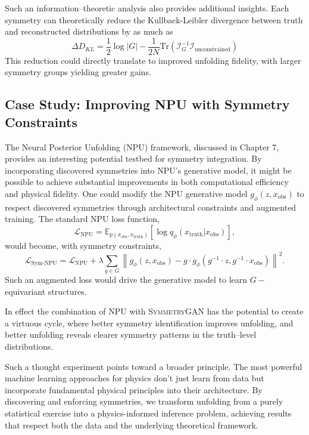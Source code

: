         Such an information--theoretic analysis also provides additional insights.
        Each symmetry can theoretically reduce the Kullback-Leibler divergence between truth and reconstructed distributions by as much as
        \[
            \Delta D_{KL} = \frac{1}{2} \log |G| - \frac{1}{2N} \text{Tr}(\mathcal{I}_G^{-1} \mathcal{I}_\text{unconstrained})
        \]
        This reduction could directly translate to improved unfolding fidelity, with larger symmetry groups yielding greater gains.

    \subsection{Case Study: Improving NPU with Symmetry Constraints}
        The Neural Posterior Unfolding (NPU) framework, discussed in Chapter 7, provides an interesting potential testbed for symmetry integration.
        By incorporating discovered symmetries into NPU's generative model, it might be possible to achieve substantial improvements in both computational efficiency and physical fidelity.
        One could modify the NPU generative model \(g_\phi(z, x_\text{obs})\) to respect discovered symmetries through architectural constraints and augmented training.
        The standard NPU loss function,
        \[
            \mathcal{L}_\text{NPU} = \mathbb{E}_{p(x_\text{obs}, x_\text{truth})} \left[ \log q_\phi(x_\text{truth} | x_\text{obs}) \right],
        \]
        would become, with symmetry constraints,
        \[
            \mathcal{L}_\text{Sym-NPU} = \mathcal{L}_\text{NPU} + \lambda \sum_{g \in G} \left\| g_\phi(z, x_\text{obs}) - g \cdot g_\phi(g^{-1} \cdot z, g^{-1} \cdot x_\text{obs}) \right\|^2.
        \]
        Such an augmented loss would drive the generative model to learn \(G-\)equivariant structures.
        
        In effect the combination of NPU with \textsc{SymmetryGAN} has the potential to create a virtuous cycle, where better symmetry identification improves unfolding, and better unfolding reveals clearer symmetry patterns in the truth--level distributions.

        Such a thought experiment points toward a broader principle.
        The most powerful machine learning approaches for physics don't just learn from data but incorporate fundamental physical principles into their architecture.
        By discovering and enforcing symmetries, we transform unfolding from a purely statistical exercise into a physics-informed inference problem, achieving results that respect both the data and the underlying theoretical framework.

